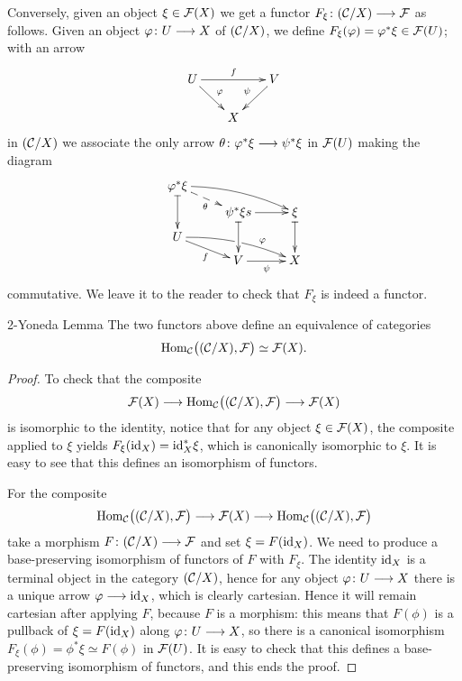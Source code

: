 \begin{3   FIBERED CATEGORIES}
\begin{3.6 Objects as fibcats and the 2-Yoneda}
Conversely, given an object $\xi \in \mathcal{F}(X)$ we get a functor $F_\xi \colon (\cC/X) \arr \cF$ as follows. Given an object $\phi\colon U \arr X$ of $(\mathcal{C}/X)$, we define $F_\xi (\varphi) = \varphi^* \xi \in \mathcal{F}(U)$; with an arrow
   \[
    \xymatrix@-6pt{
   U\ar[rd]^\phi\ar[rr]^f&&V\ar[ld]_\psi\\
   &X&
   }
   \]
in $(\mathcal{C}/X)$ we associate the only arrow $\theta \colon \phi^* \xi \arr \psi^* \xi$ in $\mathcal{F}(U)$ making the diagram 
   \[
   \xymatrix@R=6pt{{\phi^* \xi}{}\ar@{|->}[dd]
   \ar@{-->}[rd]_\theta
   \ar@/^/[rrd] \\
   & \psi^*\xi\ar@{|->}[dd]\ar[r]s
   &\xi\ar@{|->}[dd] \\
   U\ar[rd]_f\ar@/^/[rrd]|(.505)\hole^>>>>>\phi\\
   & V \ar[r]_\psi
   & X
   }
   \]
commutative. We leave it to the reader to check that $F_\xi$ is indeed a functor.

\begin{named}{2-Yoneda Lemma}\label{2-yoneda}
%
The two functors above define an equivalence of categories
   \[
   \operatorname{Hom}_{\mathcal{C}}\bigl((\mathcal{C}/X), \mathcal{F}\bigr)
   \simeq \mathcal{F}(X).
   \]
\end{named}

\begin{proof}
To check that the composite
   \[
   \cF(X) \arr 
   \hom_{\cC}\bigl((\cC/X), \cF\bigr)
   \arr \cF(X)
   \]
is isomorphic to the identity, notice that for any object $\xi \in \mathcal{F}(X)$, the composite applied to $\xi$ yields $F_\xi (\mathrm{id}_{X}) = \mathrm{id}_X^* \xi$, which is canonically isomorphic to $\xi$. It is easy to see that this defines an isomorphism of functors.

For the composite
   \[
   \hom_{\cC}\bigl((\cC/X), \cF\bigr)
   \arr \cF(X)
   \arr
   \hom_{\cC}\bigl((\cC/X), \cF\bigr)
   \]
take a morphism $F \colon (\cC/X) \arr \cF$ and set $\xi = F(\mathrm{id}_X)$. We need to produce a base-preserving isomorphism of functors of $F$ with $F_\xi$. The identity $\mathrm{id}_X$ is a terminal object in the category $(\mathcal{C}/X)$, hence for any object $\phi \colon U \arr X$ there is a unique arrow $\phi \arr \id_X$, which is clearly cartesian. Hence it will remain cartesian after applying $F$, because $F$ is a morphism: this means that $F(\phi)$ is a pullback of $\xi = F(\mathrm{id}_X)$ along $\phi \colon U \arr X$, so there is a canonical isomorphism $F_\xi(\phi) = \phi^*\xi \simeq F(\phi)$ in $\mathcal{F}(U)$. It is easy to check that this defines a base-preserving isomorphism of functors, and this ends the proof.
\end{proof}




\end{3.6 Objects as fibcats and the 2-Yoneda}
\end{3   FIBERED CATEGORIES}
